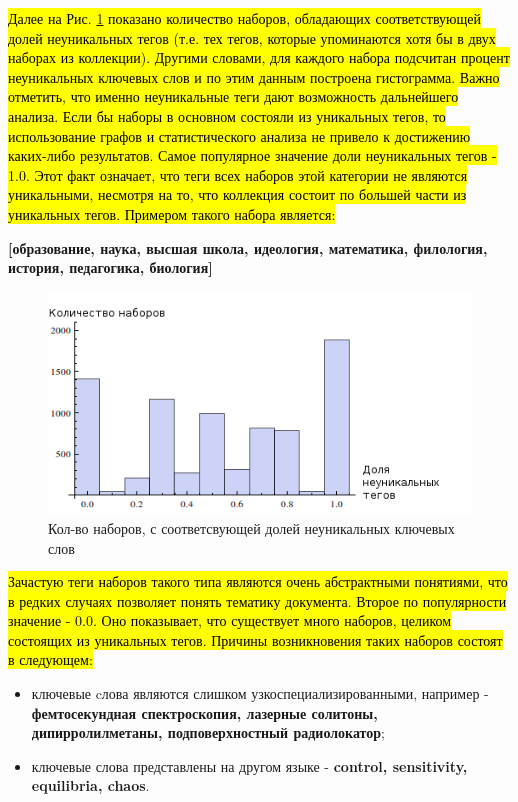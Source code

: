 \hl{Далее на Рис. \ref{img:abstr_hist} показано количество наборов, обладающих соответствующей долей неуникальных тегов (т.е. тех тегов, которые упоминаются хотя бы в двух наборах из коллекции). Другими словами, для каждого набора подсчитан процент неуникальных ключевых слов и по этим данным построена гистограмма. Важно отметить, что именно неуникальные теги дают возможность дальнейшего анализа. Если бы наборы в основном состояли из уникальных тегов, то использование графов и статистического анализа не привело к достижению каких-либо результатов. Самое популярное значение доли неуникальных тегов - 1.0. Этот факт означает, что теги всех наборов этой категории не являются уникальными, несмотря на то, что коллекция состоит по большей части из уникальных тегов. Примером такого набора является:}

\textbf{[образование, наука, высшая школа, идеология, математика, филология, история, педагогика, биология]}

\begin{figure}[ht]
  \begin{minipage}[ht]{1.0\linewidth}\centering
    \includegraphics[width=0.5\linewidth]{Dissertation/pics/abstr_hist}
    \caption{Кол-во наборов, с соответсвующей долей неуникальных ключевых слов}
  \end{minipage}
  \label{img:abstr_hist}
\end{figure}

\hl{Зачастую теги наборов такого типа являются очень абстрактными понятиями, что в редких случаях позволяет понять тематику документа. Второе по популярности значение - 0.0. Оно показывает, что существует много наборов, целиком состоящих из уникальных тегов. Причины возникновения таких наборов состоят в следующем:}

\begin{itemize}
    \item ключевые cлова являются слишком узкоспециализированными, например - \textbf{фемтосекундная спектроскопия, лазерные солитоны, дипирролилметаны, подповерхностный радиолокатор};
    \item ключевые слова представлены на другом языке - \textbf{control, sensitivity, equilibria, chaos}.
\end{itemize}


